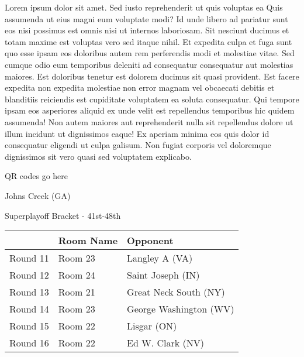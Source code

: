 \documentclass{article}%
\begin{document}
\vspace*{8pt}%
\linebreak%
\newline%
\newline%
    Lorem ipsum dolor sit amet. Sed iusto reprehenderit ut quis voluptas ea Quis assumenda ut eius magni eum voluptate modi? Id unde libero ad pariatur sunt eos nisi possimus est omnis nisi ut internos laboriosam. Sit nesciunt ducimus et totam maxime est voluptas vero sed itaque nihil. Et expedita culpa et fuga sunt quo esse ipsam eos doloribus autem rem perferendis modi et molestiae vitae.\newline%
\newline%
    Sed cumque odio eum temporibus deleniti ad consequatur consequatur aut molestias maiores. Est doloribus tenetur est dolorem ducimus sit quasi provident. Est facere expedita non expedita molestiae non error magnam vel obcaecati debitis et blanditiis reiciendis est cupiditate voluptatem ea soluta consequatur. Qui tempore ipsam eos asperiores aliquid ex unde velit est repellendus temporibus hic quidem assumenda!\newline%
\newline%
    Non autem maiores aut reprehenderit nulla sit repellendus dolore ut illum incidunt ut dignissimos eaque! Ex aperiam minima eos quis dolor id consequatur eligendi ut culpa galisum. Non fugiat corporis vel doloremque dignissimos sit vero quasi sed voluptatem explicabo.\newline%
\newline%
\vspace*{30pt}%
\begin{center}%
\begin{Huge}%
QR codes go here%
\end{Huge}%
\end{center}%
\newpage%
\begin{center}%
\begin{Huge}%
Johns Creek (GA)%
\end{Huge}%
\vspace*{8pt}%
\linebreak%
\begin{Large}%
Superplayoff Bracket {-} 41st{-}48th%
\end{Large}%
\end{center}%
%
\begin{tabularx}{\textwidth}{|c|Y|Y|}%
\hline%
&Room Name&Opponent\\%
\hline%
Round 11&Room 23&Langley A (VA)\\%
Round 12&Room 24&Saint Joseph (IN)\\%
Round 13&Room 21&Great Neck South (NY)\\%
Round 14&Room 23&George Washington (WV)\\%
Round 15&Room 22&Lisgar (ON)\\%
Round 16&Room 22&Ed W. Clark (NV)\\%
\hline%
\end{tabularx}%
\end{document}
